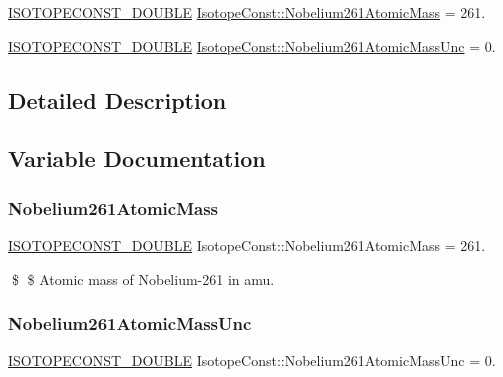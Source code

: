 \begin{DoxyCompactItemize}
\item 
\mbox{\hyperlink{group___isotope_const-_macros_ga8f45a7272ce02c0b4c65c44636ed719a}{I\+S\+O\+T\+O\+P\+E\+C\+O\+N\+S\+T\+\_\+\+D\+O\+U\+B\+LE}} \mbox{\hyperlink{group___isotope_const-_nobelium-_no261_ga45270dfce0c5c295cc9429f208e47449}{Isotope\+Const\+::\+Nobelium261\+Atomic\+Mass}} = 261.
\item 
\mbox{\hyperlink{group___isotope_const-_macros_ga8f45a7272ce02c0b4c65c44636ed719a}{I\+S\+O\+T\+O\+P\+E\+C\+O\+N\+S\+T\+\_\+\+D\+O\+U\+B\+LE}} \mbox{\hyperlink{group___isotope_const-_nobelium-_no261_ga09770e58585d94b65e04c528ff5ae396}{Isotope\+Const\+::\+Nobelium261\+Atomic\+Mass\+Unc}} = 0.
\end{DoxyCompactItemize}


\subsection{Detailed Description}


\subsection{Variable Documentation}
\mbox{\label{group___isotope_const-_nobelium-_no261_ga45270dfce0c5c295cc9429f208e47449}} 
\subsubsection{\texorpdfstring{Nobelium261\+Atomic\+Mass}{Nobelium261AtomicMass}}
{\footnotesize\ttfamily \mbox{\hyperlink{group___isotope_const-_macros_ga8f45a7272ce02c0b4c65c44636ed719a}{I\+S\+O\+T\+O\+P\+E\+C\+O\+N\+S\+T\+\_\+\+D\+O\+U\+B\+LE}} Isotope\+Const\+::\+Nobelium261\+Atomic\+Mass = 261.}

\$ \$ Atomic mass of Nobelium-\/261 in amu. \mbox{\label{group___isotope_const-_nobelium-_no261_ga09770e58585d94b65e04c528ff5ae396}} 
\subsubsection{\texorpdfstring{Nobelium261\+Atomic\+Mass\+Unc}{Nobelium261AtomicMassUnc}}
{\footnotesize\ttfamily \mbox{\hyperlink{group___isotope_const-_macros_ga8f45a7272ce02c0b4c65c44636ed719a}{I\+S\+O\+T\+O\+P\+E\+C\+O\+N\+S\+T\+\_\+\+D\+O\+U\+B\+LE}} Isotope\+Const\+::\+Nobelium261\+Atomic\+Mass\+Unc = 0.}

